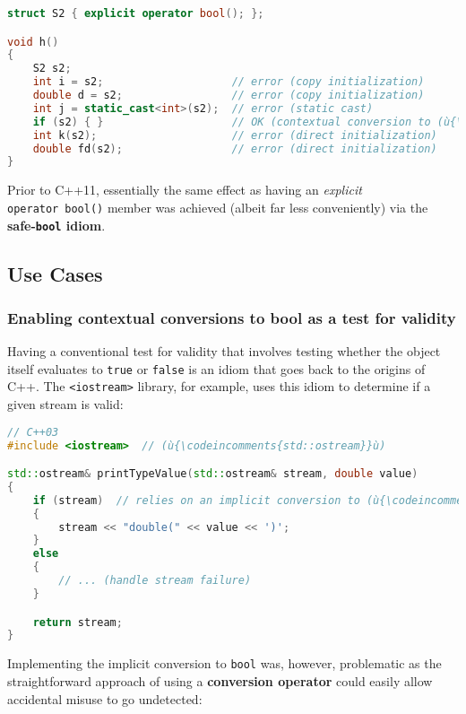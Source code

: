 \begin{lstlisting}[language=C++]
struct S2 { explicit operator bool(); };

void h()
{
    S2 s2;
    int i = s2;                    // error (copy initialization)
    double d = s2;                 // error (copy initialization)
    int j = static_cast<int>(s2);  // error (static cast)
    if (s2) { }                    // OK (contextual conversion to (ù{\codeincomments{bool}}ù))
    int k(s2);                     // error (direct initialization)
    double fd(s2);                 // error (direct initialization)
}
\end{lstlisting}
    
\noindent Prior to C++11, essentially the same effect as having an \emph{explicit}
\texttt{operator}~\texttt{bool()} member was achieved (albeit far less
conveniently) via the \textbf{safe-\texttt{bool} idiom}.

\subsection[Use Cases]{Use Cases}\label{use-cases-explicitconv}

\subsubsection[Enabling contextual conversions to {\tt bool} as a test for validity]{Enabling contextual conversions to {\SubsubsecCode bool} as a test for validity}\label{enabling-contextual-conversions-to-bool-as-a-test-for-validity}

Having a conventional test for validity that involves testing whether the object itself evaluates to \texttt{true} or \texttt{false} is an idiom that goes back to the
origins of C++. The \texttt{<iostream>} library, for example, uses this
idiom to determine if a given stream is valid:

\begin{lstlisting}[language=C++]
// C++03
#include <iostream>  // (ù{\codeincomments{std::ostream}}ù)

std::ostream& printTypeValue(std::ostream& stream, double value)
{
    if (stream)  // relies on an implicit conversion to (ù{\codeincomments{bool}}ù)
    {
        stream << "double(" << value << ')';
    }
    else
    {
        // ... (handle stream failure)
    }

    return stream;
}
\end{lstlisting}
    
\noindent Implementing the implicit conversion to \texttt{bool} was, however,
problematic as the straight\-forward approach of using a
\textbf{conversion operator} could easily allow accidental misuse to go
undetected:


